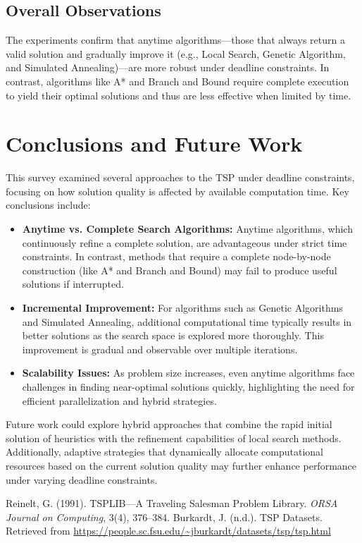 \documentclass[11pt]{article}
\begin{document}
	\subsection{Overall Observations}
	The experiments confirm that anytime algorithms—those that always return a valid solution and gradually improve it (e.g., Local Search, Genetic Algorithm, and Simulated Annealing)—are more robust under deadline constraints. In contrast, algorithms like A* and Branch and Bound require complete execution to yield their optimal solutions and thus are less effective when limited by time.
	
	\section{Conclusions and Future Work}
	This survey examined several approaches to the TSP under deadline constraints, focusing on how solution quality is affected by available computation time. Key conclusions include:
	\begin{itemize}[noitemsep]
		\item \textbf{Anytime vs. Complete Search Algorithms:} Anytime algorithms, which continuously refine a complete solution, are advantageous under strict time constraints. In contrast, methods that require a complete node-by-node construction (like A* and Branch and Bound) may fail to produce useful solutions if interrupted.
		\item \textbf{Incremental Improvement:} For algorithms such as Genetic Algorithms and Simulated Annealing, additional computational time typically results in better solutions as the search space is explored more thoroughly. This improvement is gradual and observable over multiple iterations.
		\item \textbf{Scalability Issues:} As problem size increases, even anytime algorithms face challenges in finding near-optimal solutions quickly, highlighting the need for efficient parallelization and hybrid strategies.
	\end{itemize}
	
	Future work could explore hybrid approaches that combine the rapid initial solution of heuristics with the refinement capabilities of local search methods. Additionally, adaptive strategies that dynamically allocate computational resources based on the current solution quality may further enhance performance under varying deadline constraints.
	
	\begin{thebibliography}{9}
		Reinelt, G. (1991). TSPLIB—A Traveling Salesman Problem Library. \emph{ORSA Journal on Computing}, 3(4), 376--384.
		Burkardt, J. (n.d.). TSP Datasets. Retrieved from \url{https://people.sc.fsu.edu/~jburkardt/datasets/tsp/tsp.html}
	\end{thebibliography}
	
\end{document}
